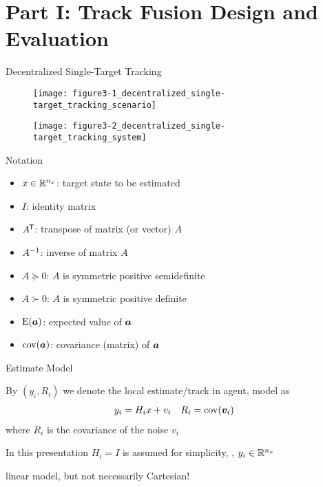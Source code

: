 \documentclass[aspectratio=1610]{beamer}
\begin{document}
\section{Part I: Track Fusion Design and Evaluation}

\begin{frame}{Decentralized Single-Target Tracking }

\begin{figure}
    \centering
    \texttt{[image: figure3-1\_decentralized\_single-target\_tracking\_scenario]}
\end{figure}


\vspace{1em}

\begin{figure}
    \texttt{[image: figure3-2\_decentralized\_single-target\_tracking\_system]}
\end{figure}

\end{frame}


\begin{frame}{Notation}

\begin{itemize}
    \item $x\in{\mathbb{R}}^{n_x}$: target state to be estimated
    \item $I$: identity matrix
    \item $A^{\mkern-1.5mu\mathsf{T}}$: transpose of matrix (or vector) $A$
    \item $A^{-1}$: inverse of matrix $A$
    \item $A\succeq0$: $A$ is symmetric positive semidefinite
    \item $A\succ0$: $A$ is symmetric positive definite
    \item $\operatorname*{\rm E}(\bm{a})$: expected value of $\bm{a}$
    \item $\operatorname*{\rm cov}(\bm{a})$: covariance (matrix) of $\bm{a}$
\end{itemize}

\end{frame}


\begin{frame}{Estimate Model}

By $(y_i,R_i)$ we denote the local estimate/track in \ith agent, model as
\begin{align*}
    y_i &= H_i x + v_i &
    R_i &= \operatorname*{\rm cov}(\bm{v}_i)
\end{align*}
where $R_i$ is the covariance of the noise $v_i$

\vspace{1em}

In this presentation $H_i=I$ is assumed for simplicity, \ie, $y_i\in{\mathbb{R}}^{n_x}$

\vspace{1em}

\alert{linear model, but not necessarily Cartesian!}

\end{frame}
\end{document}
